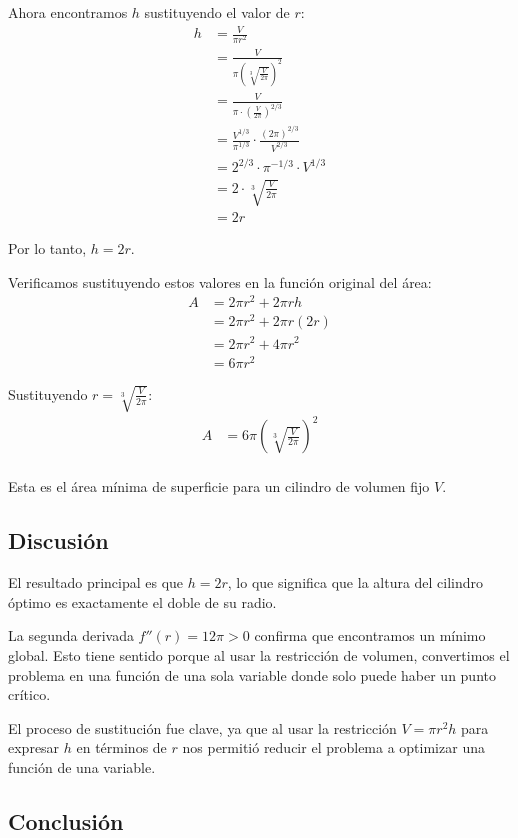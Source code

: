 \documentclass{article}
\begin{document}
Ahora encontramos $h$ sustituyendo el valor de $r$:
\begin{align}
h &= \frac{V}{\pi r^2} \\
&= \frac{V}{\pi \left(\sqrt[3]{\frac{V}{2\pi}}\right)^2} \\
&= \frac{V}{\pi \cdot \left(\frac{V}{2\pi}\right)^{2/3}} \\
&= \frac{V^{1/3}}{\pi^{1/3}} \cdot \frac{(2\pi)^{2/3}}{V^{2/3}} \\
&= 2^{2/3} \cdot \pi^{-1/3} \cdot V^{1/3} \\
&= 2 \cdot \sqrt[3]{\frac{V}{2\pi}} \\
&= 2r
\end{align}

Por lo tanto, $h = 2r$.

Verificamos sustituyendo estos valores en la función original del área:
\begin{align}
A &= 2\pi r^2 + 2\pi rh \\
&= 2\pi r^2 + 2\pi r(2r) \\
&= 2\pi r^2 + 4\pi r^2 \\
&= 6\pi r^2
\end{align}

Sustituyendo $r = \sqrt[3]{\frac{V}{2\pi}}$:
\begin{align}
A &= 6\pi \left(\sqrt[3]{\frac{V}{2\pi}}\right)^2 \\
\end{align}

Esta es el área mínima de superficie para un cilindro de volumen fijo $V$.

\subsection{Discusión}

El resultado principal es que $h = 2r$, lo que significa que la altura del cilindro óptimo es exactamente el doble de su radio. 

La segunda derivada $f''(r) = 12\pi > 0$ confirma que encontramos un mínimo global. Esto tiene sentido porque al usar la restricción de volumen, convertimos el problema en una función de una sola variable donde solo puede haber un punto crítico.

El proceso de sustitución fue clave, ya que al usar la restricción $V = \pi r^2 h$ para expresar $h$ en términos de $r$ nos permitió reducir el problema a optimizar una función de una variable.

\subsection{Conclusión}
\end{document}
